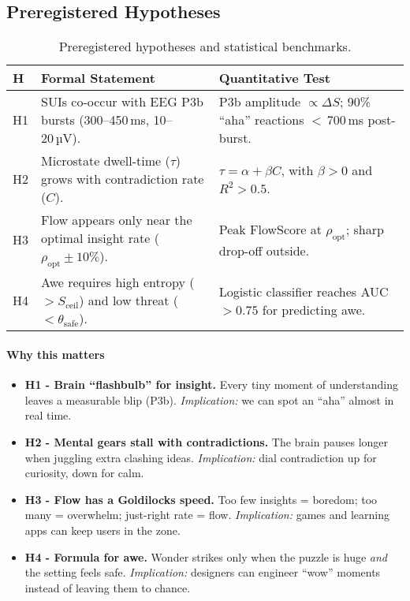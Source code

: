 \documentclass[12pt,a4paper]{article}
\begin{document}
\subsection{Preregistered Hypotheses}
\begin{table}[H]
\centering
\renewcommand{\arraystretch}{1.25}
\begin{tabular}{@{}p{0.9cm}p{7.2cm}p{5.3cm}@{}}
\toprule
\textbf{H} & \textbf{Formal Statement} & \textbf{Quantitative Test} \\
\midrule
H1 & SUIs co-occur with EEG P3b bursts (300–450 ms, 10–20 µV). & P3b amplitude $\propto \Delta S$; 90\% ``aha'' reactions $<$ 700 ms post-burst. \\
H2 & Microstate dwell-time ($\tau$) grows with contradiction rate ($C$). & $\tau = \alpha + \beta C$, with $\beta > 0$ and $R^{2} > 0.5$. \\
H3 & Flow appears only near the optimal insight rate ($\rho_{\mathrm{opt}} \pm 10\%$). & Peak FlowScore at $\rho_{\mathrm{opt}}$; sharp drop-off outside. \\
H4 & Awe requires high entropy ($> S_{\text{ceil}}$) and low threat ($< \theta_{\text{safe}}$). & Logistic classifier reaches AUC $> 0.75$ for predicting awe. \\
\bottomrule
\end{tabular}
\caption{Preregistered hypotheses and statistical benchmarks.}
\end{table}

\paragraph{Why this matters}
\begin{itemize}[leftmargin=*]
  \item \textbf{H1 - Brain ``flashbulb'' for insight.} Every tiny moment of understanding leaves a measurable blip (P3b). \emph{Implication:} we can spot an “aha” almost in real time.
  \item \textbf{H2 - Mental gears stall with contradictions.} The brain pauses longer when juggling extra clashing ideas. \emph{Implication:} dial contradiction up for curiosity, down for calm.
  \item \textbf{H3 - Flow has a Goldilocks speed.} Too few insights = boredom; too many = overwhelm; just-right rate = flow. \emph{Implication:} games and learning apps can keep users in the zone.
  \item \textbf{H4 - Formula for awe.} Wonder strikes only when the puzzle is huge \emph{and} the setting feels safe. \emph{Implication:} designers can engineer ``wow'' moments instead of leaving them to chance.
\end{itemize}
\end{document}
